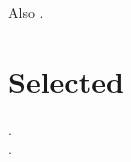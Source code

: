 \documentclass{article}
\begin{document}
Also \citet{k2}.

\section*{Selected}
.\\
.
\end{document}

